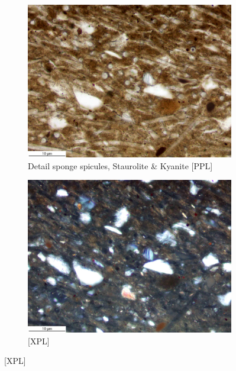 \documentclass[a4paper]{article}
\begin{document}
\begin{figure}[H]
\begin{subfigure}[t]{.32\textwidth}
		\includegraphics[width=\textwidth]{ThinSections/2-3_20x_PPL.jpg}
		\caption{Detail sponge spicules, Staurolite \& Kyanite [PPL]}
	\end{subfigure}\hspace{.5em}\hfill
	\begin{subfigure}[t]{.32\textwidth}
		\includegraphics[width=\textwidth]{ThinSections/2-3_20x_XPL.jpg}
		\caption{[XPL]}
	\end{subfigure}\hspace{.5em}\hfill

\end{figure}
\end{document}

